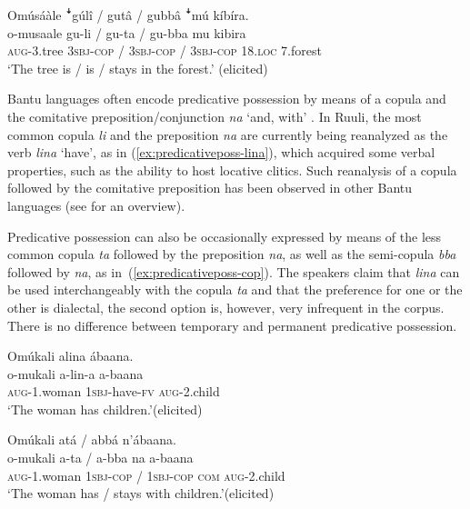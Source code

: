 \documentclass[output=paper,colorlinks,citecolor=brown,draftmode]{langscibook}
\begin{document}
\ea \label{ex:locli}
	\glll   Omúsáàle ꜜgúlî / gutâ / gubbâ ꜜmú kíbíra.\\
	        o-musaale gu-li / gu-ta / gu-bba mu kibira\\
	    	\textsc{aug}-3.tree \textsc{3sbj}-\textsc{cop} / \textsc{3sbj}-\textsc{cop} / \textsc{3sbj}-\textsc{cop} 18.\textsc{loc} 7.forest\\
	\glt ‘The tree is / is / stays in the forest.’ (elicited)
\z

Bantu languages often encode predicative possession by means of a copula and the comitative preposition/conjunction \textit{na} `and, with' \citep{Creissels2018}. 
In Ruuli, the most common copula \textit{li} and the preposition \textit{na} are currently being reanalyzed as the verb \textit{lina} `have', as in (\ref{ex:predicativeposs-lina}), which acquired some verbal properties, such as the ability to host locative clitics. 
Such reanalysis of a copula followed by the comitative preposition has been observed in other Bantu languages (see \citealt{Creissels2018} for an overview).

Predicative possession can also be occasionally expressed by means of the less common copula \textit{ta} followed by the preposition \textit{na}, as well as the semi-copula \textit{bba} followed by \textit{na}, as in~(\ref{ex:predicativeposs-cop}). 
The speakers claim that \textit{lina} can be used interchangeably with the copula \textit{ta} and that the preference for one or the other is dialectal, the second option is, however, very infrequent in the corpus.
There is no difference between temporary and permanent predicative possession. 


\ea \label{ex:predicativeposs}
\begin{xlist}
\ex \label{ex:predicativeposs-lina}
\glll Omúkali alina ábaana.\\
	        o-mukali a-lin-a a-baana\\
		\textsc{aug}-1.woman 1\textsc{sbj}-have-\textsc{fv}  \textsc{aug}-2.child\\
\glt ‘The woman has children.’(elicited)

\ex \label{ex:predicativeposs-cop}
\glll Omúkali atá / abbá n’ábaana.\\
	        o-mukali a-ta / a-bba na a-baana\\
		\textsc{aug}-1.woman 1\textsc{sbj}-\textsc{cop} / 1\textsc{sbj}-\textsc{cop} \textsc{com} \textsc{aug}-2.child\\
\glt ‘The woman has / stays with children.’(elicited)
\end{xlist}
\z 
\end{document}
